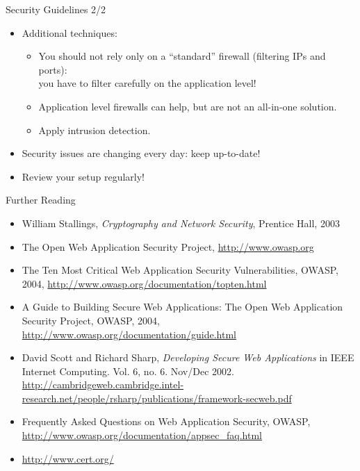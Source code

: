 \documentclass{beamer}
\begin{document}
\begin{slide}{Security Guidelines 2/2}
  \begin{itemize}
    \item Additional techniques:
    \begin{itemize}
      \item You should not rely only on a ``standard'' firewall (filtering IPs 
            and ports):\\ 
            you have to filter carefully on the application level!
      \item Application level firewalls can help, but are not an all-in-one 
            solution.
      \item Apply intrusion detection.
    \end{itemize}
    \item Security issues are changing every day: keep up-to-date!
    \item Review your setup regularly!
  \end{itemize}
\end{slide}
\begin{printout}
\begin{slide}{Further Reading}
{\small\begin{itemize}
\item William Stallings, \emph{Cryptography and Network Security}, Prentice Hall, 2003
\item The Open Web Application Security Project, \url{http://www.owasp.org}
\item The Ten Most Critical Web Application Security Vulnerabilities, OWASP, 2004, 
      \url{http://www.owasp.org/documentation/topten.html}
\item A Guide to Building Secure Web Applications: The Open Web Application Security Project, 
      OWASP, 2004, 
      \url{http://www.owasp.org/documentation/guide.html}
\item David Scott and Richard Sharp, \emph{Developing Secure Web Applications} in 
       IEEE Internet Computing. Vol. 6, no. 6. Nov/Dec 2002.
       \url{http://cambridgeweb.cambridge.intel-research.net/people/rsharp/publications/framework-secweb.pdf}
\item Frequently Asked Questions on Web Application Security, OWASP, 
      \url{http://www.owasp.org/documentation/appsec_faq.html}
\item \url{http://www.cert.org/}
\end{itemize}}
\end{slide}
\end{printout}



\end{document}
